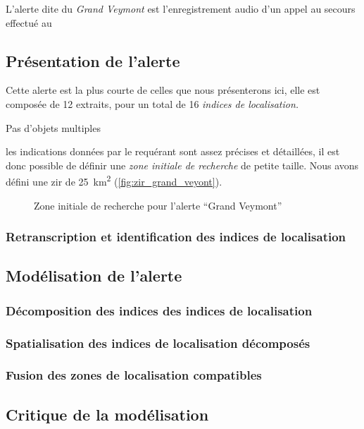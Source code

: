 L'alerte dite du \emph{Grand Veymont} est l'enregistrement audio d'un
appel au secours effectué au 

\subsection{Présentation de l'alerte}
\label{subsec:9-2-1}

Cette alerte est la plus courte de celles que nous présenterons ici,
elle est composée de 12 extraits, pour un total de 16 \emph{indices de
  localisation.}

Pas d'objets multiples

les indications données par le requérant sont assez précises et
détaillées, il est donc possible de définir une \emph{zone initiale de
  recherche} de petite taille. Nous avons défini une \ac{zir} de
\SI{25}{\kilo\meter\squared} (\autoref{fig:zir_grand_veyont}).

\begin{figure}
  \centering
  
  \caption{Zone initiale de recherche pour l'alerte \enquote{Grand Veymont}}
  \label{fig:zir_grand_veyont}
\end{figure}



\subsubsection{Retranscription et identification des indices de localisation}
\label{subsec:9-2-1-1}







\subsection{Modélisation de l'alerte}
\label{subsec:9-2-2}


\subsubsection{Décomposition des indices des indices de localisation}
\label{subsec:9-2-2-2}

\subsubsection{Spatialisation des indices de localisation décomposés}
\label{subsec:9-2-2-3}

\subsubsection{Fusion des zones de localisation compatibles}
\label{subsec:9-2-2-4}



\subsection{Critique de la modélisation}
\label{subsec:9-2-3}

